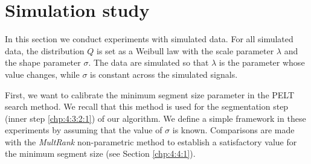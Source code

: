 


\section{Simulation study}\label{chp:4:4}


In this section we conduct experiments with simulated data. For all simulated data, the distribution $Q$ is set as a Weibull law with the scale parameter $\lambda$ and the shape parameter $\sigma$. The data are simulated so that $\lambda$ is the parameter whose value changes, while $\sigma$ is constant across the simulated signals.  

First, we want to calibrate the minimum segment size parameter in the PELT search method. We recall that this method is used for the segmentation step (inner step \ref{chp:4:3:2:1}) of our algorithm. We define a simple framework in these experiments by assuming that the value of $\sigma$ is known. Comparisons are made with the \textit{MultRank} non-parametric method \citep{lung2015} to establish a satisfactory value for the minimum segment size (see Section \ref{chp:4:4:1}).  

